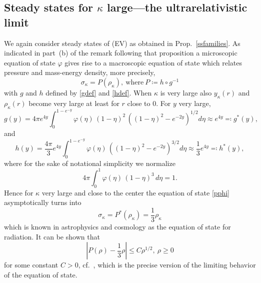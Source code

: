 \documentclass[11pt]{article}
\begin{document}
\subsection{Steady states for $\kappa$ large---the ultrarelativistic limit}
\label{stst_ultrarel}
%
%
We again consider steady states of (EV) as obtained in
Prop.~\ref{ssfamilies}. As indicated in part~(b) of the remark following that
proposition
a microscopic equation of state $\varphi$ gives rise to a
macroscopic equation of state which relates pressure and mass-energy density,
more precisely,
\begin{equation} \label{pphi}
  \sigma_\kappa = P(\rho_\kappa),\ \mbox{where}\ P \coloneqq h\circ g^{-1}
\end{equation}
with $g$ and $h$ defined by \eqref{gdef} and \eqref{hdef}. When $\kappa$ is
very large also $y_\kappa(r)$ and $\rho_\kappa(r)$ become very large at
least for $r$ close to $0$.
For $y$ very large,
\begin{equation} \label{gdef_as}
  g(y) = 4 \pi e^{4 y} \int_0^{1-e^{-y}} \varphi(\eta)\, (1-\eta)^2\,
  \left((1-\eta)^2 - e^{-2y}\right)^{1/2} d\eta
  \approx e^{4y} \eqqcolon g^\ast (y),
\end{equation}
and
\begin{equation} \label{hdef_as}
  h(y) =
  \frac{4 \pi}{3} e^{4y} \int_0^{1-e^{-y}} \varphi(\eta)\,
  \left((1-\eta)^2-e^{-2y}\right)^{3/2} d\eta
  \approx \frac{1}{3} e^{4y} \eqqcolon h^\ast (y), 
\end{equation}
where for the sake of notational simplicity we normalize
\[
4 \pi \int_0^{1} \varphi(\eta)\, (1-\eta)^3\, d\eta = 1.
\]
Hence for $\kappa$ very large and close to the center the
equation of state \eqref{pphi} asymptotically turns into 
\begin{equation} \label{radiation}
  \sigma_\kappa = P^\ast (\rho_\kappa) = \frac{1}{3} \rho_\kappa
\end{equation}
which is known in astrophysics and cosmology as the equation of state for
radiation. It can be shown that
\[ 
\left|P(\rho) -\frac{1}{3} \rho\right| \leq C \rho^{1/2},\ \rho\geq 0
\]
for some constant $C>0$, cf.~\cite{HaLinRe}, which is the precise version
of the limiting behavior of the equation of state.
\end{document}
